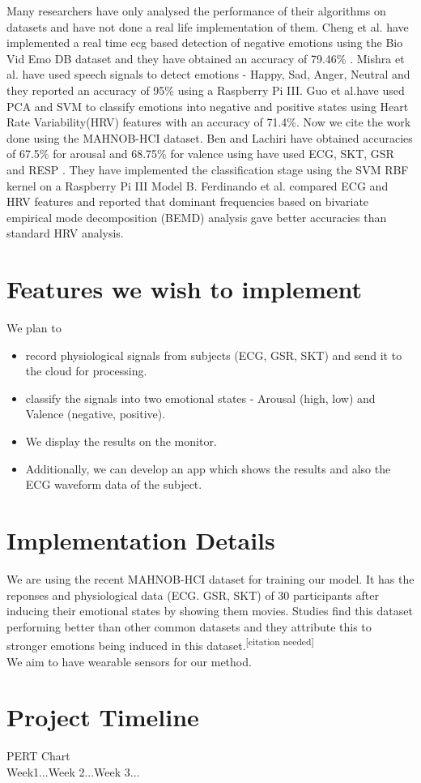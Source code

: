 \documentclass[11pt]{article}
\theoremstyle{definition}
\begin{document}
    Many researchers have only analysed the performance of their algorithms on datasets and have not done a real life implementation of them.
    Cheng et al.\cite{cheng_novel_2017} have implemented a real time ecg based detection of negative emotions using the Bio Vid Emo DB dataset and they have obtained an accuracy of 79.46\% . 
    Mishra et al.\cite{mishra_speech} have used speech signals to detect emotions - Happy, Sad, Anger, Neutral and they reported an accuracy of 95\% using a Raspberry Pi III.
    Guo et al.\cite{guo_heart_2016}have used PCA and SVM to classify emotions into negative and positive states using Heart Rate Variability(HRV) features with an accuracy of 71.4\%.
    Now we cite the work done using the MAHNOB-HCI dataset\cite{mahnob_hci}. 
    Ben and Lachiri\cite{ben_rpi} have obtained accuracies of 67.5\% for arousal and 68.75\% for valence using have used ECG, SKT, GSR and RESP . They have implemented the classification stage using the SVM RBF kernel on a Raspberry Pi III Model B.
    Ferdinando et al.\cite{ferdinando_comparing_2016} compared ECG and HRV features and reported that dominant frequencies based on
    bivariate empirical mode decomposition (BEMD) analysis gave better accuracies than standard HRV analysis.
   
  \section{Features we wish to implement}
    We plan to 
    \begin{itemize}
      \item record physiological signals from subjects (ECG, GSR, SKT) and send it to the cloud for processing.
      \item classify the signals into two emotional states - Arousal (high, low) and Valence (negative, positive).\cite{ben_emotion_2017}
      \item We display the results on the monitor.
      \item Additionally, we can develop an app which shows the results and also the ECG waveform data of the subject.
    \end{itemize}

  \section{Implementation Details}
    We are using the recent MAHNOB-HCI dataset\cite{mahnob_hci} for training our model. It has the reponses and physiological data (ECG. GSR, SKT) of 30 participants after inducing their emotional states by showing them movies. Studies find this dataset performing better than other common datasets and they attribute this to stronger emotions being induced in this dataset.\textsuperscript{[citation needed]}\\
    We aim to have wearable sensors for our method.

  \section{Project Timeline}
    PERT Chart\\
    Week1...Week 2...Week 3...
  
  \newpage
  
  
\end{document}
